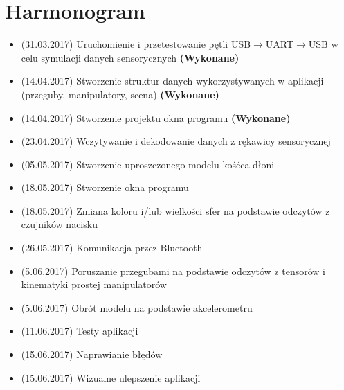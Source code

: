 \documentclass[12pt,a4paper]{article}
\begin{document}
\newpage
\section{Harmonogram}
\begin{itemize}
\item (31.03.2017) Uruchomienie i przetestowanie pętli USB$\rightarrow $UART$\rightarrow $USB w celu symulacji danych sensorycznych \textbf{(Wykonane)}
\item (14.04.2017) Stworzenie struktur danych wykorzystywanych w aplikacji (przeguby, manipulatory, scena) \textbf{(Wykonane)}
\item (14.04.2017) Stworzenie projektu okna programu \textbf{(Wykonane)}
\item (23.04.2017) Wczytywanie i dekodowanie danych z rękawicy sensorycznej
\item (05.05.2017) Stworzenie uproszczonego modelu kośćca dłoni
\item (18.05.2017) Stworzenie okna programu
\item (18.05.2017) Zmiana koloru i/lub wielkości sfer na podstawie odczytów z czujników nacisku
\item (26.05.2017) Komunikacja przez Bluetooth
\item (5.06.2017) Poruszanie przegubami na podstawie odczytów z tensorów i kinematyki prostej manipulatorów
\item (5.06.2017) Obrót modelu na podstawie akcelerometru
\item (11.06.2017) Testy aplikacji
\item (15.06.2017) Naprawianie błędów
\item (15.06.2017) Wizualne ulepszenie aplikacji
\end{itemize}


\end{document}
